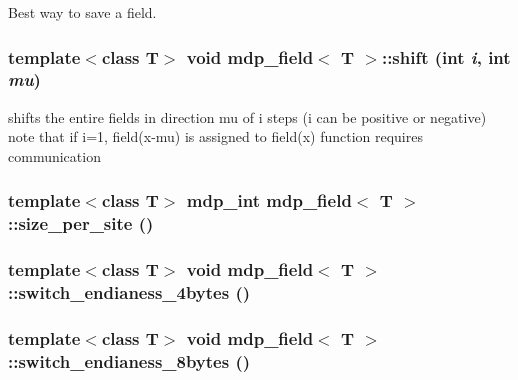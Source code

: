 Best way to save a field. \hypertarget{classmdp__field_a8ff0ae3336b70be5c58299322662275e}{
\subsubsection[{shift}]{\setlength{\rightskip}{0pt plus 5cm}template$<$class T$>$ void {\bf mdp\_\-field}$<$ T $>$::shift (int {\em i}, \/  int {\em mu})}}
\label{classmdp__field_a8ff0ae3336b70be5c58299322662275e}
shifts the entire fields in direction mu of i steps (i can be positive or negative) note that if i=1, field(x-\/mu) is assigned to field(x) function requires communication \hypertarget{classmdp__field_a0fc58cc1e14667b4ad3638baab91f28a}{
\subsubsection[{size\_\-per\_\-site}]{\setlength{\rightskip}{0pt plus 5cm}template$<$class T$>$ {\bf mdp\_\-int} {\bf mdp\_\-field}$<$ T $>$::size\_\-per\_\-site ()}}
\label{classmdp__field_a0fc58cc1e14667b4ad3638baab91f28a}
\hypertarget{classmdp__field_ac9f44455cd31baa03e00ca5b601f199c}{
\subsubsection[{switch\_\-endianess\_\-4bytes}]{\setlength{\rightskip}{0pt plus 5cm}template$<$class T$>$ void {\bf mdp\_\-field}$<$ T $>$::switch\_\-endianess\_\-4bytes ()}}
\label{classmdp__field_ac9f44455cd31baa03e00ca5b601f199c}
\hypertarget{classmdp__field_a8db821b09a101730bcbcf27ccd1a25f5}{
\subsubsection[{switch\_\-endianess\_\-8bytes}]{\setlength{\rightskip}{0pt plus 5cm}template$<$class T$>$ void {\bf mdp\_\-field}$<$ T $>$::switch\_\-endianess\_\-8bytes ()}}
